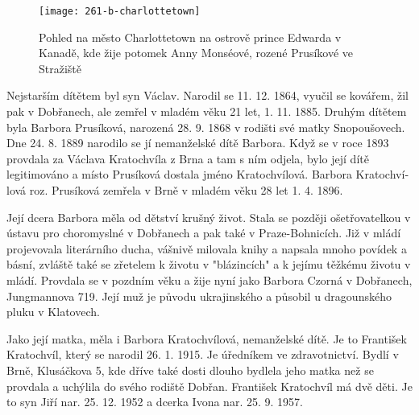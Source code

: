 \documentclass[../dejiny-rodu-prusiku.tex]{subfiles}
\begin{document}
             \begin{figure}
\centering
\texttt{[image: 261-b-charlottetown]}
\caption{Pohled na město Charlottetown na ostrově prince Edwarda v Kanadě, kde žije potomek Anny Monséové, rozené Prusíkové ve Stražiště}
\label{fig:261-b-charlottetown}
\end{figure}

Nejstarším dítětem byl syn Václav. Narodil se 11. 12. 1864, vyučil se kovářem, žil pak v Dobřanech, ale zemřel v mladém věku 21 let, 1. 11. 1885. Druhým dítětem byla Barbora Prusíková, narozená 28. 9. 1868 v rodišti své matky Snopoušovech. Dne 24. 8. 1889 narodilo se jí nemanželské dítě Barbora. Když se v roce 1893 provdala za Václava Kratochvíla z Brna a tam s ním odjela, bylo její dítě legitimováno a místo Prusíková dostala jméno Kratochvílová. Barbora Kratochví­lová roz. Prusíková zemřela v Brně v mladém věku 28 let 1. 4. 1896.

Její dcera Barbora měla od dětství krušný život. Stala se později ošetřovatelkou v ústavu pro choromyslné v Dobřanech a pak také v Praze-Bohnicích. Již v mládí projevovala literárního ducha, vášnivě milovala knihy a napsala mnoho povídek a básní, zvláště také se zřetelem k životu v "blázincích" a k jejímu těžkému životu v mládí. Provdala se v pozdním věku a žije nyní jako Barbora Czorná v Dobřanech, Jungmannova 719. Její muž je původu ukrajinského a působil u dragounského pluku v Klatovech.

Jako její matka, měla i Barbora Kratochvílová, nemanželské dítě. Je to František Kratochvíl, který se narodil 26. 1. 1915. Je úředníkem ve zdravotnictví. Bydlí v Brně, Klusáčkova 5, kde dříve také dosti dlouho bydlela jeho matka než se provdala a uchýlila do svého rodiště Dobřan. František Kratochvíl má dvě děti. Je to syn Jiří nar. 25. 12. 1952 a dcerka Ivona nar. 25. 9. 1957.
\end{document}
